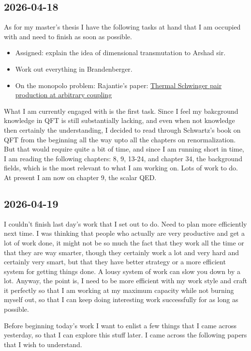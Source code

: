 \documentclass[11pt,a4paper]{article}
\begin{document}
\subsection{2026-04-18}
As for my master's thesis I have the following tasks at hand that I am occupied with and need to finish as soon as possible. 
\begin{itemize}
	\item Assigned: explain the idea of dimensional transmutation to Arshad sir. 
	
	\item Work out everything in Brandenberger. 
	
	\item On the monopolo problem: Rajantie's paper: \href{https://arxiv.org/pdf/1704.04801}{Thermal Schwinger pair production at arbitrary coupling}
\end{itemize}
What I am currently engaged with is the first task. Since I feel my bakcground knowledge in QFT is still substantially lacking, and even when not knowledge then certainly the understanding, I decided to read through Schwartz's book on QFT from the beginning all the way upto all the chapters on renormalization. But that would require quite a bit of time, and since I am running short in time, I am reading the following chapters: 8, 9, 13-24, and chapter 34, the background fields, which is the most relevant to what I am working on. Lots of work to do. At present I am now on chapter 9, the scalar QED. 


\subsection{2026-04-19}
I couldn't finish last day's work that I set out to do. Need to plan more efficiently next time. I was thinking that people who actually are very productive and get a lot of work done, it might not be so much the fact that they work all the time or that they are way smarter, though they certainly work a lot and very hard and certainly very smart, but that they have better strategy or a more efficient system for getting things done. A lousy system of work can slow you down by a lot. Anyway, the point is, I need to be more efficient with my work style and craft it perfectly so that I am working at my maximum capacity while not burning myself out, so that I can keep doing interesting work successfully for as long as possible.

Before beginning today's work I want to enlist a few things that I came across yesterday, so that I can explore this stuff later. I came across the following papers that I wish to understand. 
\end{document}
